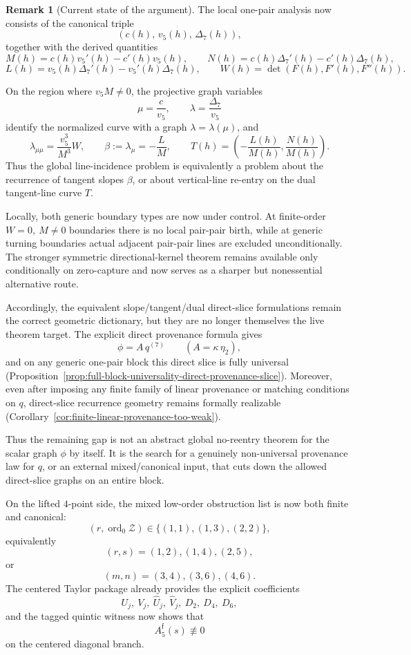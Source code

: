 \documentclass[11pt,a4paper]{amsart}
\theoremstyle{plain}
\theoremstyle{definition}
\newtheorem{remark}[theorem]{Remark}
\begin{document}
\begin{remark}[Current state of the argument]
\label{rem:current-state-of-argument}
The local one-pair analysis now consists of the canonical triple
\[
(c(h),\,v_5(h),\,\Delta_7(h)),
\]
together with the derived quantities
\[
M(h)=c(h)v_5'(h)-c'(h)v_5(h),
\qquad
N(h)=c(h)\Delta_7'(h)-c'(h)\Delta_7(h),
\]
\[
L(h)=v_5(h)\Delta_7'(h)-v_5'(h)\Delta_7(h),
\qquad
W(h)=\det(F(h),F'(h),F''(h)).
\]

On the region where $v_5M\neq 0$, the projective graph variables
\[
\mu=\frac{c}{v_5},
\qquad
\lambda=\frac{\Delta_7}{v_5}
\]
identify the normalized curve with a graph $\lambda=\lambda(\mu)$, and
\[
\lambda_{\mu\mu}=\frac{v_5^3}{M^3}W,
\qquad
\beta:=\lambda_\mu=-\frac{L}{M},
\qquad
T(h)=\left(-\frac{L(h)}{M(h)},\frac{N(h)}{M(h)}\right).
\]
Thus the global line-incidence problem is equivalently a problem about the
recurrence of tangent slopes $\beta$, or about vertical-line re-entry on the
dual tangent-line curve $T$.

Locally, both generic boundary types are now under control. At finite-order
$W=0,\ M\neq 0$ boundaries there is no local pair-pair birth, while at
generic turning boundaries actual adjacent pair-pair lines are excluded
unconditionally. The stronger symmetric directional-kernel theorem remains
available only conditionally on zero-capture and now serves as a sharper but
nonessential alternative route.

Accordingly, the equivalent slope/tangent/dual direct-slice formulations remain
the correct geometric dictionary, but they are no longer themselves the live
theorem target. The explicit direct provenance formula gives
\[
\phi=A\,q^{(7)}
\qquad
(A=\kappa\,\eta_2),
\]
and on any generic one-pair block this direct slice is fully universal
(Proposition~\ref{prop:full-block-universality-direct-provenance-slice}).
Moreover, even after imposing any finite family of linear provenance or
matching conditions on $q$, direct-slice recurrence geometry remains formally
realizable (Corollary~\ref{cor:finite-linear-provenance-too-weak}).

Thus the remaining gap is not an abstract global no-reentry theorem for the
scalar graph $\phi$ by itself. It is the search for a genuinely non-universal
provenance law for $q$, or an external mixed/canonical input, that cuts down
the allowed direct-slice graphs on an entire block.

On the lifted $4$-point side, the mixed low-order obstruction list is now both
finite and canonical:
\[
(r,\operatorname{ord}_0\mathcal Z)\in\{(1,1),(1,3),(2,2)\},
\]
equivalently
\[
(r,s)=(1,2),(1,4),(2,5),
\]
or
\[
(m,n)=(3,4),(3,6),(4,6).
\]
The centered Taylor package already provides the explicit coefficients
\[
U_j,\ V_j,\ \widehat U_j,\ \widehat V_j,\ D_2,\ D_4,\ D_6,
\]
and the tagged quintic witness now shows that
\[
A_5^{\mathfrak f}(s)\not\equiv 0
\]
on the centered diagonal branch.


\end{remark}
\end{document}
